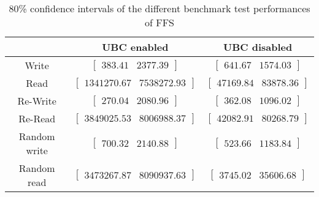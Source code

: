 
	\begin{table}
	\caption{80\% confidence intervals of the different benchmark test performances of FFS}
	\begin{tabular}{| c | c | c |}
	\hline
	{} & \textbf{UBC enabled} & \textbf{UBC disabled} \\
	\hline
	\hline
	Write &$\left[ \begin{array}{rr} 383.41 & 2377.39 \end{array}\right] $ &$\left[ \begin{array}{rr} 641.67 & 1574.03 \end{array}\right] $\\ 
Read &$\left[ \begin{array}{rr} 1341270.67 & 7538272.93 \end{array}\right] $ &$\left[ \begin{array}{rr} 47169.84 & 83878.36 \end{array}\right] $\\ 
Re-Write &$\left[ \begin{array}{rr} 270.04 & 2080.96 \end{array}\right] $ &$\left[ \begin{array}{rr} 362.08 & 1096.02 \end{array}\right] $\\ 
Re-Read &$\left[ \begin{array}{rr} 3849025.53 & 8006988.37 \end{array}\right] $ &$\left[ \begin{array}{rr} 42082.91 & 80268.79 \end{array}\right] $\\ 
Random write &$\left[ \begin{array}{rr} 700.32 & 2140.88 \end{array}\right] $ &$\left[ \begin{array}{rr} 523.66 & 1183.84 \end{array}\right] $\\ 
Random read &$\left[ \begin{array}{rr} 3473267.87 & 8090937.63 \end{array}\right] $ &$\left[ \begin{array}{rr} 3745.02 & 35606.68 \end{array}\right] $\\ 

		\hline
		\end{tabular}
		\label{tbl:bootstrap-table-ffs}
		\end{table}
	